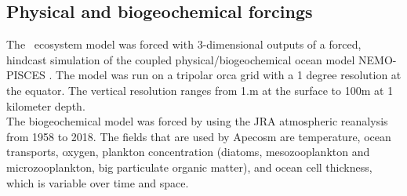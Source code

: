 \subsection{Physical and biogeochemical forcings}

The \ap\ ecosystem model was forced with 3-dimensional outputs of a forced, hindcast simulation of the coupled physical/biogeochemical 
ocean model NEMO-PISCES \citep{aumontPISCESv2OceanBiogeochemical2015}. The model was run on a tripolar orca grid \citep{madecGlobalOceanMesh1996} with a
1 degree resolution at the equator. The vertical resolution ranges from 1.m at the surface to 100m at 1 kilometer depth. \\

The biogeochemical model was forced by using the JRA atmospheric reanalysis \citep{kobayashiJRA55ReanalysisGeneral2015} from 1958 to 2018.
The fields that are used by Apecosm are temperature, ocean transports, oxygen, plankton concentration (diatoms, mesozooplankton and microzooplankton, big particulate organic matter), \ppar and ocean cell thickness, which is variable over time and space. \\
